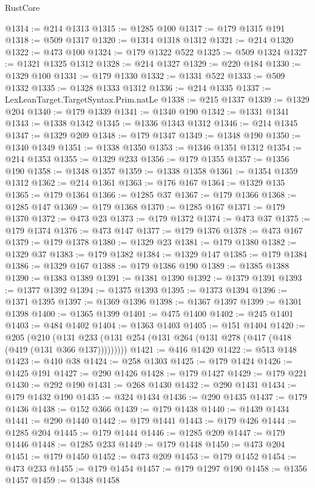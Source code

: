 \begin{lexlean}{RustCore}
\begin{coremodule}
@1314 := @214 @1313
@1315 := @1285 @100
@1317 := @179 @1315 @191
@1318 := @509 @1317
@1320 := @1314 @1318 @1312
@1321 := @214 @1320
@1322 := @473 @100
@1324 := @179 @1322 @522
@1325 := @509 @1324
@1327 := @1321 @1325 @1312
@1328 := @214 @1327
@1329 := @220 @184
@1330 := @1329 @100
@1331 := @179 @1330
@1332 := @1331 @522
@1333 := @509 @1332
@1335 := @1328 @1333 @1312
@1336 := @214 @1335
@1337 := LexLeanTarget.TargetSyntax.Prim.natLe
@1338 := @215 @1337
@1339 := @1329 @204
@1340 := @179 @1339
@1341 := @1340 @190
@1342 := @1331 @1341
@1343 := @1338 @1342
@1345 := @1336 @1343 @1312
@1346 := @214 @1345
@1347 := @1329 @209
@1348 := @179 @1347
@1349 := @1348 @190
@1350 := @1340 @1349
@1351 := @1338 @1350
@1353 := @1346 @1351 @1312
@1354 := @214 @1353
@1355 := @1329 @233
@1356 := @179 @1355
@1357 := @1356 @190
@1358 := @1348 @1357
@1359 := @1338 @1358
@1361 := @1354 @1359 @1312
@1362 := @214 @1361
@1363 := @176 @167
@1364 := @1329 @135
@1365 := @179 @1364
@1366 := @1285 @37
@1367 := @179 @1366
@1368 := @1285 @147
@1369 := @179 @1368
@1370 := @1285 @167
@1371 := @179 @1370
@1372 := @473 @23
@1373 := @179 @1372
@1374 := @473 @37
@1375 := @179 @1374
@1376 := @473 @147
@1377 := @179 @1376
@1378 := @473 @167
@1379 := @179 @1378
@1380 := @1329 @23
@1381 := @179 @1380
@1382 := @1329 @37
@1383 := @179 @1382
@1384 := @1329 @147
@1385 := @179 @1384
@1386 := @1329 @167
@1388 := @179 @1386 @190
@1389 := @1385 @1388
@1390 := @1383 @1389
@1391 := @1381 @1390
@1392 := @1379 @1391
@1393 := @1377 @1392
@1394 := @1375 @1393
@1395 := @1373 @1394
@1396 := @1371 @1395
@1397 := @1369 @1396
@1398 := @1367 @1397
@1399 := @1301 @1398
@1400 := @1365 @1399
@1401 := @475 @1400
@1402 := @245 @1401
@1403 := @484 @1402
@1404 := @1363 @1403
@1405 := @151 @1404
@1420 := @205
    (@210 (@131 @233 (@131 @254 (@131 @264 (@131 @278 (@417 (@418 (@419 (@131 @366 @137)))))))))
@1421 := @416 @1420
@1422 := @513 @148
@1423 := @410 @38
@1424 := @258 @1303
@1425 := @179 @1424
@1426 := @1425 @191
@1427 := @290 @1426
@1428 := @179 @1427
@1429 := @179 @221
@1430 := @292 @190
@1431 := @268 @1430
@1432 := @290 @1431
@1434 := @179 @1432 @190
@1435 := @324 @1434
@1436 := @290 @1435
@1437 := @179 @1436
@1438 := @152 @366
@1439 := @179 @1438
@1440 := @1439 @1434
@1441 := @290 @1440
@1442 := @179 @1441
@1443 := @179 @426
@1444 := @1285 @204
@1445 := @179 @1444
@1446 := @1285 @209
@1447 := @179 @1446
@1448 := @1285 @233
@1449 := @179 @1448
@1450 := @473 @204
@1451 := @179 @1450
@1452 := @473 @209
@1453 := @179 @1452
@1454 := @473 @233
@1455 := @179 @1454
@1457 := @179 @1297 @190
@1458 := @1356 @1457
@1459 := @1348 @1458

\end{coremodule}
\end{lexlean}
